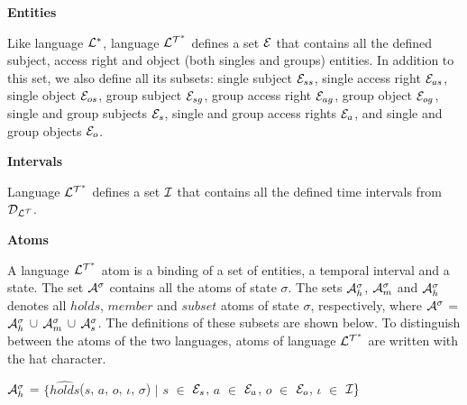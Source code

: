 \documentclass[11pt]{report}
\newenvironment{vquote}
{
  \begin{list}{}{\leftmargin 1em}\item[]
}
{
  \end{list}
}
\begin{document}
          \begin{itemize}
            \item
              {\bf Entities}

              Like language ${\cal L^*}$, language ${\cal L^{T^*}}$ defines
              a set ${\cal E}$ that contains all the defined subject, access
              right and object (both singles and groups) entities. In addition
              to this set, we also define all its subsets: single subject
              ${\cal E}_{ss}$, single access right ${\cal E}_{as}$, single
              object ${\cal E}_{os}$, group subject ${\cal E}_{sg}$, group
              access right ${\cal E}_{ag}$, group object ${\cal E}_{og}$,
              single and group subjects ${\cal E}_{s}$, single and group access
              rights ${\cal E}_{a}$, and single and group objects
              ${\cal E}_{o}$.

            \item
              {\bf Intervals}

              Language ${\cal L^{T^*}}$ defines a set ${\cal I}$ that contains
              all the defined time intervals from ${\cal D_{L^T}}$.

            \item
              {\bf Atoms}

              A language ${\cal L^{T^*}}$ atom is a binding of a set of
              entities, a temporal interval and a state. The set
              ${\cal A}^\sigma$ contains all the atoms of state $\sigma$.
              The sets ${\cal A}^{\sigma}_{h}$, ${\cal A}^{\sigma}_{m}$ and
              ${\cal A}^{\sigma}_{h}$ denotes all $holds$, $member$ and
              $subset$ atoms of state $\sigma$, respectively, where
              ${\cal A}^\sigma$ = ${\cal A}^{\sigma}_{h}$ $\cup$
              ${\cal A}^{\sigma}_{m}$ $\cup$ ${\cal A}^{\sigma}_{s}$. The
              definitions of these subsets are shown below. To distinguish
              between the atoms of the two languages, atoms of language
              ${\cal L^{T^*}}$ are written with the hat character.

              \begin{vquote}
                ${\cal A}^{\sigma}_{h}$ =
                  $\{\hat{holds}$($s$, $a$, $o$, $\iota$, $\sigma$) $\mid$
                  $s$ $\in$ ${\cal E}_{s}$,
                  $a$ $\in$ ${\cal E}_{a}$,
                  $o$ $\in$ ${\cal E}_{o}$, 
                  $\iota$ $\in$ ${\cal I}\}$ 
    

\end{vquote}
\end{itemize}
\end{document}
